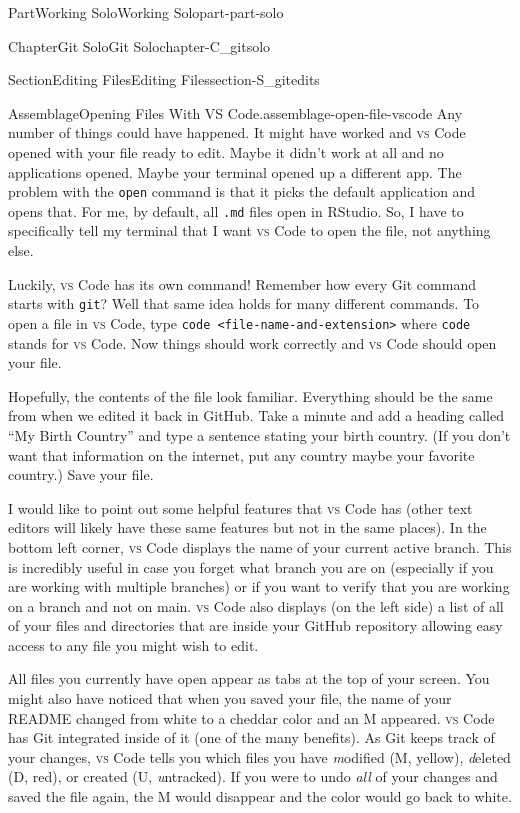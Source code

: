 \documentclass[oneside,10pt,]{book}
\newcommand{\mono}[1]{\texttt{#1}}
\newcommand{\initialism}[1]{\textsc{\MakeLowercase{#1}}}
\DeclareRobustCommand{\initialismintitle}[1]{\texorpdfstring{#1}{#1}}
\begin{document}
\begin{partptx}{Part}{Working Solo}{}{Working Solo}{}{}{part-part-solo}
\begin{chapterptx}{Chapter}{Git Solo}{}{Git Solo}{}{}{chapter-C_gitsolo}
\begin{sectionptx}{Section}{Editing Files}{}{Editing Files}{}{}{section-S_gitedits}
\begin{assemblage}{Assemblage}{Opening Files With \initialismintitle{VS} Code.}{assemblage-open-file-vscode}
Any number of things could have happened. It might have worked and \initialism{VS} Code opened with your file ready to edit. Maybe it didn't work at all and no applications opened. Maybe your terminal opened up a different app. The problem with the \mono{open} command is that it picks the default application and opens that. For me, by default, all \mono{.md} files open in RStudio. So, I have to specifically tell my terminal that I want \initialism{VS} Code to open the file, not anything else.%
\par
Luckily, \initialism{VS} Code has its own command! Remember how every Git command starts with \mono{git}? Well that same idea holds for many different commands. To open a file in \initialism{VS} Code, type \mono{code <file-name-and-extension>} where \mono{code} stands for \initialism{VS} Code. Now things should work correctly and \initialism{VS} Code should open your file.%
\end{assemblage}
Hopefully, the contents of the file look familiar. Everything should be the same from when we edited it back in GitHub. Take a minute and add a heading called ``My Birth Country'' and type a sentence stating your birth country. (If you don't want that information on the internet, put any country \textellipsis{} maybe your favorite country.) Save your file.%
\par
I would like to point out some helpful features that \initialism{VS} Code has (other text editors will likely have these same features but not in the same places). In the bottom left corner, \initialism{VS} Code displays the name of your current active branch. This is incredibly useful in case you forget what branch you are on (especially if you are working with multiple branches) or if you want to verify that you are working on a branch and not on main. \initialism{VS} Code also displays (on the left side) a list of all of your files and directories that are inside your GitHub repository allowing easy access to any file you might wish to edit.%
\par
All files you currently have open appear as tabs at the top of your screen. You might also have noticed that when you saved your file, the name of your README changed from white to a cheddar color and an M appeared. \initialism{VS} Code has Git integrated inside of it (one of the many benefits). As Git keeps track of your changes, \initialism{VS} Code tells you which files you have \emph{m}odified (M, yellow), \emph{d}eleted (D, red), or created (U, \emph{u}ntracked). If you were to undo \emph{all} of your changes and saved the file again, the M would disappear and the color would go back to white.%

\end{sectionptx}
\end{chapterptx}
\end{partptx}
\end{document}
